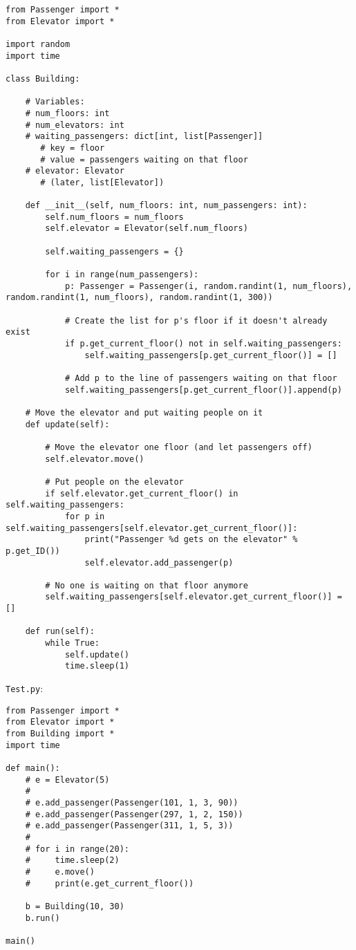 \documentclass{article}
\begin{document}
\begin{verbatim}
from Passenger import *
from Elevator import *

import random
import time

class Building:

    # Variables:
    # num_floors: int
    # num_elevators: int
    # waiting_passengers: dict[int, list[Passenger]]
       # key = floor
       # value = passengers waiting on that floor
    # elevator: Elevator
       # (later, list[Elevator])

    def __init__(self, num_floors: int, num_passengers: int):
        self.num_floors = num_floors
        self.elevator = Elevator(self.num_floors)

        self.waiting_passengers = {}

        for i in range(num_passengers):
            p: Passenger = Passenger(i, random.randint(1, num_floors), random.randint(1, num_floors), random.randint(1, 300))

            # Create the list for p's floor if it doesn't already exist
            if p.get_current_floor() not in self.waiting_passengers:
                self.waiting_passengers[p.get_current_floor()] = []

            # Add p to the line of passengers waiting on that floor
            self.waiting_passengers[p.get_current_floor()].append(p)

    # Move the elevator and put waiting people on it
    def update(self):

        # Move the elevator one floor (and let passengers off)
        self.elevator.move()

        # Put people on the elevator
        if self.elevator.get_current_floor() in self.waiting_passengers:
            for p in self.waiting_passengers[self.elevator.get_current_floor()]:
                print("Passenger %d gets on the elevator" % p.get_ID())
                self.elevator.add_passenger(p)

        # No one is waiting on that floor anymore
        self.waiting_passengers[self.elevator.get_current_floor()] = []

    def run(self):
        while True:
            self.update()
            time.sleep(1)
\end{verbatim}

\newpage
\noindent \texttt{Test.py}:

\begin{verbatim}
from Passenger import *
from Elevator import *
from Building import *
import time

def main():
    # e = Elevator(5)
    #
    # e.add_passenger(Passenger(101, 1, 3, 90))
    # e.add_passenger(Passenger(297, 1, 2, 150))
    # e.add_passenger(Passenger(311, 1, 5, 3))
    #
    # for i in range(20):
    #     time.sleep(2)
    #     e.move()
    #     print(e.get_current_floor())

    b = Building(10, 30)
    b.run()

main()
\end{verbatim}
\end{document}
